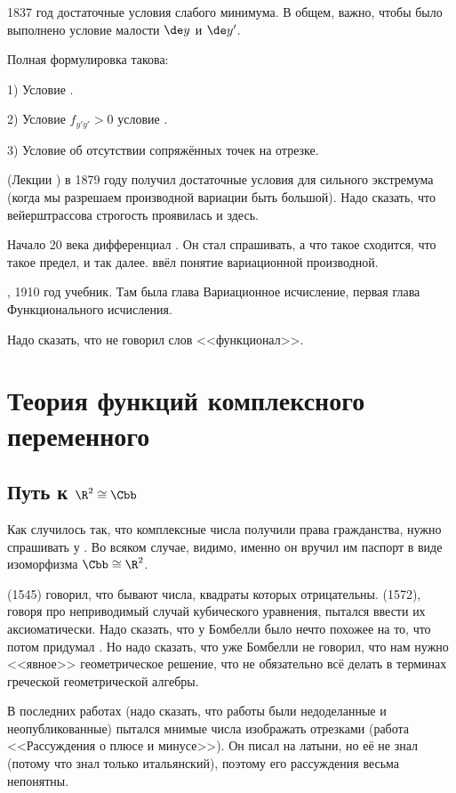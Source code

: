 \documentclass[a4paper,oneside,fleqn,10pt]{article}
\begin{document}
1837 год достаточные условия слабого минимума. В общем, важно, чтобы было выполнено
условие малости $\de y$  и $\de y'$.

Полная формулировка такова:

1) Условие .

2) Условие $f_{y'y'} > 0$ условие .

3) Условие  об отсутствии сопряжённых точек на отрезке.

 (Лекции ) в 1879 году получил достаточные условия
для сильного экстремума (когда мы разрешаем производной вариации быть большой).
Надо сказать, что вейерштрассова строгость проявилась и здесь.

Начало 20 века дифференциал . Он стал спрашивать, а что такое сходится,
что такое предел, и так далее.  ввёл понятие вариационной производной.

, 1910 год учебник. Там была глава Вариационное исчисление, первая глава Функционального исчисления.

Надо сказать, что  не говорил слов <<функционал>>.


\section{Теория функций комплексного переменного}

\subsection{Путь к $\R^2 \cong \Cbb$}

Как случилось так, что комплексные числа получили права гражданства,
нужно спрашивать у . Во всяком случае, видимо, именно он вручил
им паспорт в виде изоморфизма $\Cbb \cong \R^2$.

 (1545) говорил, что бывают числа, квадраты которых отрицательны.
 (1572), говоря про неприводимый случай кубического уравнения, пытался
ввести их аксиоматически. Надо сказать, что у Бомбелли было нечто похожее
на то, что потом придумал . Но надо сказать, что уже Бомбелли не говорил,
что нам нужно <<явное>> геометрическое решение, что не обязательно всё делать
в терминах греческой геометрической алгебры.

В последних работах  (надо сказать, что работы были недоделанные и неопубликованные)
пытался мнимые числа изображать отрезками (работа <<Рассуждения о плюсе и минусе>>).
Он писал на латыни, но её не знал
(потому что знал только итальянский), поэтому его рассуждения весьма непонятны.
\end{document}
